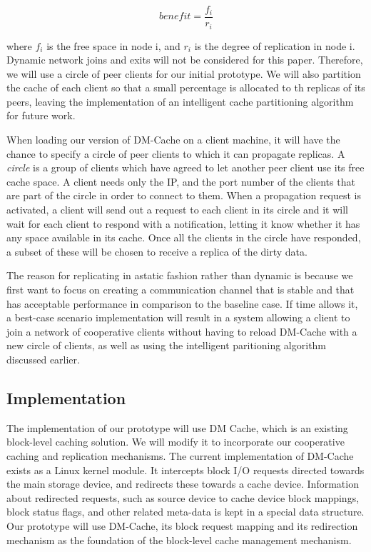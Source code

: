 \begin{equation}
	benefit=\frac{f_i}{r_i}
\end{equation}

where $f_i$
is the free space in node i, and $r_i$ is the degree
of replication in node i. Dynamic network joins and exits
will not be considered for this paper. Therefore, we will
use a circle of peer clients for our initial prototype.
We will also partition the cache of each client so that
a small percentage is allocated to th replicas of its
peers, leaving the implementation of an intelligent
cache partitioning algorithm for future work.

When loading our version of DM-Cache on a client machine,
it will have the chance to specify a circle of peer clients
to which it can propagate replicas. A \textit{circle} is a
group of clients which have agreed to let another peer
client use its free cache space. A client needs only the IP,
and the port number of the clients that are part of
the circle in order to connect to them. When a propagation
request is activated, a client will send out a request to
each client in its circle and it will wait for each client
to respond with a notification, letting it know whether it
has any space available in its cache. Once all the clients
in the circle have responded, a subset of these will be
chosen to receive a replica of the dirty data.

The reason for replicating in astatic fashion rather than dynamic is
because we first want to focus on creating
a communication channel that is stable and that has acceptable performance
in comparison to the baseline case. If time allows it, a best-case scenario
implementation will result in a system allowing a client to join a network of
cooperative clients without having to reload DM-Cache with a new circle of clients,
as well as using the intelligent paritioning algorithm discussed earlier.

\subsection{Implementation}

The implementation of our prototype will use DM Cache,
which is an existing block-level caching solution. We will
modify it to incorporate our cooperative caching and
replication mechanisms. The current implementation of
DM-Cache exists as a Linux kernel module. It intercepts
block I/O requests directed towards the main storage device,
and redirects these towards a cache device. Information
about redirected requests, such as source device to cache
device block mappings, block status flags, and other
related meta-data is kept in a special data structure. Our
prototype will use DM-Cache, its block request mapping and
its redirection mechanism as the foundation of
the block-level cache management mechanism.

